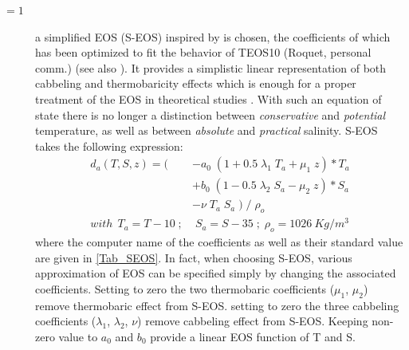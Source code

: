 \begin{description}
\item[$=1$] a simplified EOS (S-EOS) inspired by \citet{Vallis06} is chosen, 
the coefficients of which has been optimized to fit the behavior of TEOS10 (Roquet, personal comm.) 
(see also \citet{Roquet_JPO2015}). It provides a simplistic linear representation of both 
cabbeling and thermobaricity effects which is enough for a proper treatment of the EOS 
in theoretical studies \citep{Roquet_JPO2015}.
With such an equation of state there is no longer a distinction between 
\textit{conservative} and \textit{potential} temperature, as well as between \textit{absolute} 
and \textit{practical} salinity.
S-EOS takes the following expression:
\begin{equation} \label{Eq_tra_S-EOS}
\begin{split}
  d_a(T,S,z)  =  ( & - a_0 \; ( 1 + 0.5 \; \lambda_1 \; T_a + \mu_1 \; z ) * T_a  \\
                                & + b_0 \; ( 1 - 0.5 \; \lambda_2 \; S_a - \mu_2 \; z ) * S_a  \\
                                & - \nu \; T_a \; S_a \;  ) \; / \; \rho_o                     \\
  with \ \  T_a = T-10  \; ;  & \;  S_a = S-35  \; ;\;  \rho_o = 1026~Kg/m^3
\end{split}
\end{equation} 
where the computer name of the coefficients as well as their standard value are given in \ref{Tab_SEOS}.
In fact, when choosing S-EOS, various approximation of EOS can be specified simply by changing 
the associated coefficients. 
Setting to zero the two thermobaric coefficients ($\mu_1$, $\mu_2$) remove thermobaric effect from S-EOS.
setting to zero the three cabbeling coefficients ($\lambda_1$, $\lambda_2$, $\nu$) remove cabbeling effect from S-EOS.
Keeping non-zero value to $a_0$ and $b_0$ provide a linear EOS function of T and S.

\end{description}



